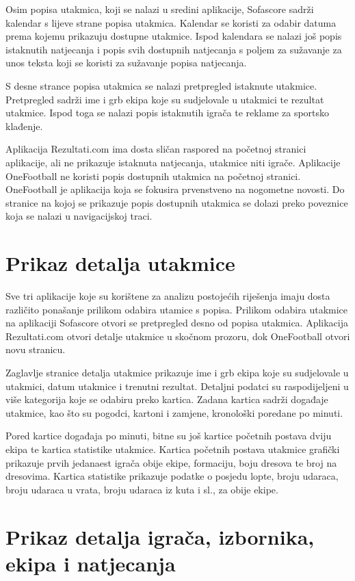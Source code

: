 \documentclass[times, utf8, zavrsni]{fer}
\begin{document}
Osim popisa utakmica, koji se nalazi u sredini aplikacije, Sofascore sadrži kalendar s lijeve strane popisa utakmica.
Kalendar se koristi za odabir datuma prema kojemu prikazuju dostupne utakmice.
Ispod kalendara se nalazi još popis istaknutih natjecanja i popis svih dostupnih natjecanja s poljem za sužavanje za unos teksta koji se koristi za sužavanje popisa natjecanja.

S desne strance popisa utakmica se nalazi pretpregled istaknute utakmice. Pretpregled sadrži ime i grb ekipa koje su sudjelovale u utakmici te rezultat utakmice.
Ispod toga se nalazi popis istaknutih igrača te reklame za sportsko klađenje.

Aplikacija Rezultati.com ima dosta sličan raspored na početnoj stranici aplikacije, ali ne prikazuje istaknuta natjecanja, utakmice niti igrače.
Aplikacije OneFootball ne koristi popis dostupnih utakmica na početnoj stranici. OneFootball je aplikacija koja se fokusira prvenstveno na nogometne novosti.
Do stranice na kojoj se prikazuje popis dostupnih utakmica se dolazi preko poveznice koja se nalazi u navigacijskoj traci.

\section{Prikaz detalja utakmice}

Sve tri aplikacije koje su korištene za analizu postojećih riješenja imaju dosta različito ponašanje prilikom odabira utamice s popisa.
Prilikom odabira utakmice na aplikaciji Sofascore otvori se pretpregled desno od popisa utakmica.
Aplikacija Rezultati.com otvori detalje utakmice u skočnom prozoru, dok OneFootball otvori novu stranicu.

Zaglavlje stranice detalja utakmice prikazuje ime i grb ekipa koje su sudjelovale u utakmici, datum utakmice i trenutni rezultat.
Detaljni podatci su raspodijeljeni u više kategorija koje se odabiru preko kartica. Zadana kartica sadrži događaje utakmice, kao što su pogodci, kartoni i zamjene, kronološki poredane po minuti.

Pored kartice događaja po minuti, bitne su još kartice početnih postava dviju ekipa te kartica statistike utakmice.
Kartica početnih postava utakmice grafički prikazuje prvih jedanaest igrača obije ekipe, formaciju, boju dresova te broj na dresovima.
Kartica statistike prikazuje podatke o posjedu lopte, broju udaraca, broju udaraca u vrata, broju udaraca iz kuta i sl., za obije ekipe.

\section{Prikaz detalja igrača, izbornika, ekipa i natjecanja}
\end{document}
